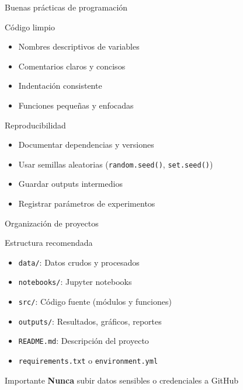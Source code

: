 \documentclass[aspectratio=169]{beamer}
\begin{document}
\begin{frame}{Buenas prácticas de programación}
\begin{block}{Código limpio}
\begin{itemize}
    \item Nombres descriptivos de variables
    \item Comentarios claros y concisos
    \item Indentación consistente
    \item Funciones pequeñas y enfocadas
\end{itemize}
\end{block}

\begin{block}{Reproducibilidad}
\begin{itemize}
    \item Documentar dependencias y versiones
    \item Usar semillas aleatorias (\texttt{random.seed()}, \texttt{set.seed()})
    \item Guardar outputs intermedios
    \item Registrar parámetros de experimentos
\end{itemize}
\end{block}
\end{frame}

\begin{frame}{Organización de proyectos}
\begin{block}{Estructura recomendada}
\begin{itemize}
    \item \texttt{data/}: Datos crudos y procesados
    \item \texttt{notebooks/}: Jupyter notebooks
    \item \texttt{src/}: Código fuente (módulos y funciones)
    \item \texttt{outputs/}: Resultados, gráficos, reportes
    \item \texttt{README.md}: Descripción del proyecto
    \item \texttt{requirements.txt} o \texttt{environment.yml}
\end{itemize}
\end{block}

\begin{alertblock}{Importante}
\textbf{Nunca} subir datos sensibles o credenciales a GitHub
\end{alertblock}
\end{frame}
\end{document}
